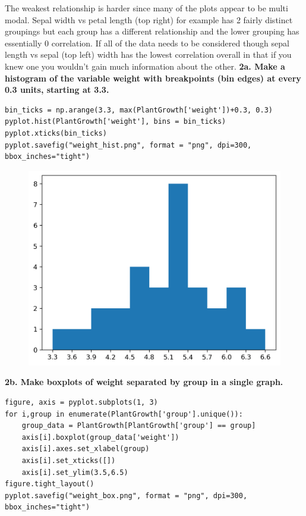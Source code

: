 \documentclass[preview, margin=0.5in]{standalone}
\begin{document}
The weakest relationship is harder since many of the plots appear to be multi modal. Sepal width vs petal length (top right) for example has 2 fairly distinct groupings but each group has a different relationship and the lower grouping has essentially 0 correlation. If all of the data needs to be considered though sepal length vs sepal (top left) width has the lowest correlation overall in that if you knew one you wouldn't gain much information about the other.
\textbf{2a. Make a histogram of the variable weight with breakpoints (bin edges) at every 0.3 units, starting at 3.3.}
\begin{verbatim}
bin_ticks = np.arange(3.3, max(PlantGrowth['weight'])+0.3, 0.3)
pyplot.hist(PlantGrowth['weight'], bins = bin_ticks)
pyplot.xticks(bin_ticks)
pyplot.savefig("weight_hist.png", format = "png", dpi=300, bbox_inches="tight")
\end{verbatim}
\begin{figure}
    \includegraphics[]{weight_hist.png}
\end{figure}
\textbf{2b. Make boxplots of weight separated by group in a single graph.}
\begin{verbatim}
figure, axis = pyplot.subplots(1, 3)
for i,group in enumerate(PlantGrowth['group'].unique()):
    group_data = PlantGrowth[PlantGrowth['group'] == group]
    axis[i].boxplot(group_data['weight'])
    axis[i].axes.set_xlabel(group)
    axis[i].set_xticks([])
    axis[i].set_ylim(3.5,6.5)
figure.tight_layout()
pyplot.savefig("weight_box.png", format = "png", dpi=300, bbox_inches="tight")
\end{verbatim}
\end{document}

